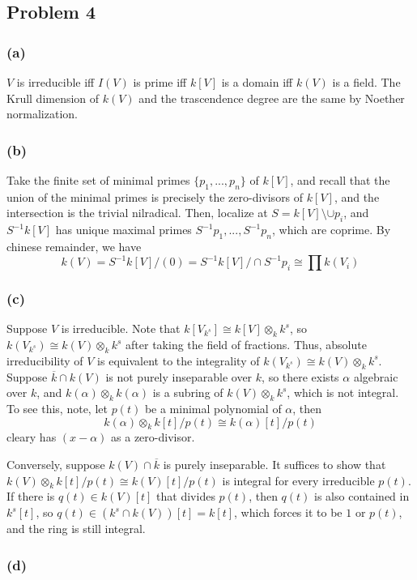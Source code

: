 \documentclass{article}
\theoremstyle{definition}
\theoremstyle{definition}
\theoremstyle{definition}
\theoremstyle{definition}
\theoremstyle{definition}
\theoremstyle{definition}
\theoremstyle{definition}
\begin{document}
\subsection*{Problem 4}
\subsubsection*{(a)}
$V$ is irreducible iff $I(V)$ is prime iff $k[V]$ is a domain iff $k(V)$ is a field. The Krull dimension of $k(V)$ and the trascendence degree are the same by Noether normalization.
\subsubsection*{(b)}
Take the finite set of minimal primes $\{p_1,...,p_n\}$ of $k[V]$, and recall that the union of the minimal primes is precisely the zero-divisors of $k[V]$, and the intersection is the trivial nilradical. Then, localize at $S=k[V]\setminus \cup p_i$, and $S^{-1}k[V]$ has unique maximal primes $S^{-1}p_1,...,S^{-1}p_n$, which are coprime. By chinese remainder, we have
\[k(V)=S^{-1}k[V]/(0)=S^{-1}k[V]/\cap S^{-1}p_i\cong \prod k(V_i)  \]
\subsubsection*{(c)}
Suppose $V$ is irreducible. Note that $k[V_{k^s}]\cong k[V]\otimes_k k^s$, so $k(V_{k^s})\cong k(V)\otimes_k k^s$ after taking the field of fractions. Thus, absolute irreducibility of $V$ is equivalent to the integrality of $k(V_{k^s})\cong k(V)\otimes_k k^s$. Suppose $\overline{k}\cap k(V)$ is not purely inseparable over $k$, so there exists $\alpha$ algebraic over $k$, and $k(\alpha)\otimes_k k(\alpha)$ is a subring of $k(V)\otimes_k k^s$, which is not integral. To see this, note, let $p(t)$ be a minimal polynomial of $\alpha$, then
\[k(\alpha)\otimes_k k[t]/p(t)\cong k(\alpha)[t]/p(t)\]
cleary has $(x-\alpha)$ as a zero-divisor. 

Conversely, suppose $k(V)\cap \overline{k}$ is purely inseparable. It suffices to show that $k(V)\otimes_k k[t]/p(t)\cong  k(V)[t]/p(t)$ is integral for every irreducible $p(t)$. If there is $q(t)\in k(V)[t]$ that divides $p(t)$, then $q(t)$ is also contained in $k^s[t]$, so $q(t)\in (k^s\cap k(V))[t]=k[t]$,  which forces it to be $1$ or $p(t)$, and the ring is still integral. 

\subsubsection*{(d)}
\end{document}
